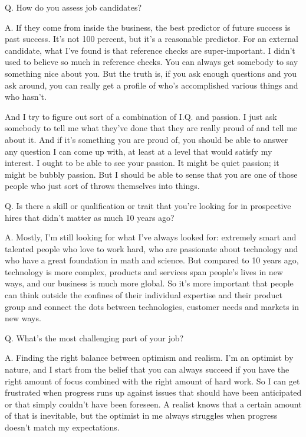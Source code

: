 \documentclass[12pt,a4paper,onecolumn]{article}
\begin{document}
\textsf{Q. How do you assess job candidates?}

A. If they come from inside the business, the best predictor of future success is past success. It's
not 100 percent, but it's a reasonable predictor. For an external candidate, what I've found is that
reference checks are super-important. I didn't used to believe so much in reference checks. You can
always get somebody to say something nice about you. But the truth is, if you ask enough questions
and you ask around, you can really get a profile of who's accomplished various things and who
hasn't.

And I try to figure out sort of a combination of I.Q. and passion. I just ask somebody to tell me
what they've done that they are really proud of and tell me about it. And if it's something you are
proud of, you should be able to answer any question I can come up with, at least at a level that
would satisfy my interest. I ought to be able to see your passion. It might be quiet passion; it
might be bubbly passion. But I should be able to sense that you are one of those people who just
sort of throws themselves into things.

\textsf{Q. Is there a skill or qualification or trait that you're looking for in prospective hires that}
didn't matter as much 10 years ago?

A. Mostly, I'm still looking for what I've always looked for: extremely smart and talented people
who love to work hard, who are passionate about technology and who have a great foundation in math
and science. But compared to 10 years ago, technology is more complex, products and services span
people's lives in new ways, and our business is much more global. So it's more important that people
can think outside the confines of their individual expertise and their product group and connect the
dots between technologies, customer needs and markets in new ways.

\textsf{Q. What's the most challenging part of your job?}

A. Finding the right balance between optimism and realism. I'm an optimist by nature, and I start
from the belief that you can always succeed if you have the right amount of focus combined with the
right amount of hard work. So I can get frustrated when progress runs up against issues that should
have been anticipated or that simply couldn't have been foreseen. A realist knows that a certain
amount of that is inevitable, but the optimist in me always struggles when progress doesn't match my
expectations.
\end{document}
